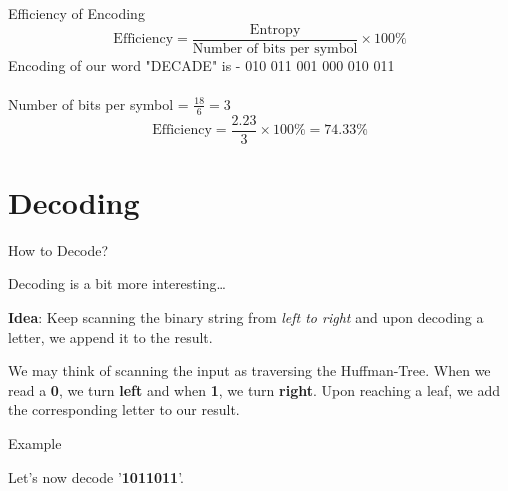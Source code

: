\documentclass{beamer}
\begin{document}
	\setbeamercovered{}
	\begin{frame}{Efficiency of Encoding}
		\[
		\text{Efficiency} = \frac{\text{Entropy}}{\text{Number of bits per symbol}} \times 100 \%
		\]
		$$$$
		Encoding of our word "DECADE" is - 010 011 001 000 010 011
		\\\\
		Number of bits per symbol = $\frac{18}{6} = 3$
		$$$$
		\[
		\text{Efficiency} = \frac{2.23}{3}\times 100\% = 74.33\%
		\]
	\end{frame}
	
	
	\section{Decoding}
	
	\setbeamercovered{}
	\begin{frame}{How to Decode?}
		
		\begin{block}{Decoding is a bit more interesting\ldots}
			
			\textbf{Idea}: Keep scanning the binary string from \textit{left to right} and upon decoding a letter, we append it to the result.
			
		\end{block}
		
		\begin{alertblock}{}
			We may think of scanning the input as traversing the Huffman-Tree. When we read a \textbf{0}, we turn \textbf{left} and when \textbf{1}, we turn \textbf{right}. Upon reaching a leaf, we add the corresponding letter to our result.
		\end{alertblock}
		
	\end{frame}
	
	
	\begin{frame}{Example}
		
		\begin{block}{}
			
			Let's now decode '\textbf{1011011}'.
			
		\end{block}
		
	\end{frame}
	
\end{document}
